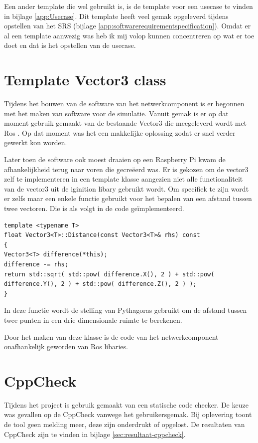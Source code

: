 \documentclass[a4paper, 11pt, oneside]{report}
\begin{document}
Een ander template die wel gebruikt is, is de template voor een usecase te vinden in bijlage \ref{app:Usecase}.
Dit template heeft veel gemak opgeleverd tijdens opstellen van het SRS (bijlage \ref{app:softwarerequirementspecification}). 
Omdat er al een template aanwezig was heb ik mij volop kunnen concentreren op wat er toe doet en dat is het opstellen van de usecase. 



\section{Template Vector3 class}

Tijdens het bouwen van de software van het netwerkcomponent is er begonnen met het maken van software voor de simulatie.
Vanuit gemak is er op dat moment gebruik gemaakt van de bestaande Vector3 die meegeleverd wordt met Ros \cite{ignitionVector}.
Op dat moment was het een makkelijke oplossing zodat er snel verder gewerkt kon worden. 

Later toen de software ook moest draaien op een Raspberry Pi kwam de afhankelijkheid terug naar voren die gecreëerd was.
Er is gekozen om de vector3 zelf te implementeren in een template klasse aangezien niet alle functionaliteit van de vector3 uit de iginition libary\cite{ignitionVector} gebruikt wordt.
Om specifiek te zijn wordt er zelfs maar een enkele functie gebruikt voor het bepalen van een afstand tussen twee vectoren.
Die is als volgt in de code geïmplementeerd. 

\begin{lstlisting}
template <typename T>
float Vector3<T>::Distance(const Vector3<T>& rhs) const
{
Vector3<T> difference(*this);
difference -= rhs;
return std::sqrt( std::pow( difference.X(), 2 ) + std::pow( difference.Y(), 2 ) + std::pow( difference.Z(), 2 ) );
}
\end{lstlisting}

In deze functie wordt de stelling van Pythagoras gebruikt om de afstand tussen twee punten in een drie dimensionale ruimte te berekenen.

Door het maken van deze klasse is de code van het netwerkcomponent onafhankelijk geworden van Ros libaries.

\section{CppCheck}
Tijdens het project is gebruik gemaakt van een statische code checker.
De keuze was gevallen op de CppCheck vanwege het gebruikersgemak.
Bij oplevering toont de tool geen melding meer, deze zijn onderdrukt of opgelost.
De resultaten van CppCheck zijn te vinden in bijlage \ref{sec:resultaat-cppcheck}.
\end{document}

